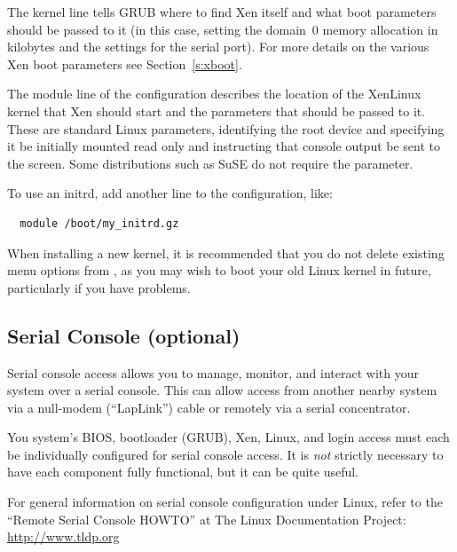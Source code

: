 \documentclass[11pt,twoside,final,openright]{report}
\begin{document}
The kernel line tells GRUB where to find Xen itself and what boot
parameters should be passed to it (in this case, setting the domain~0
memory allocation in kilobytes and the settings for the serial port).
For more details on the various Xen boot parameters see
Section~\ref{s:xboot}.

The module line of the configuration describes the location of the
XenLinux kernel that Xen should start and the parameters that should be
passed to it. These are standard Linux parameters, identifying the root
device and specifying it be initially mounted read only and instructing
that console output be sent to the screen. Some distributions such as
SuSE do not require the  parameter.


To use an initrd, add another  line to the configuration,
like: {\small
\begin{verbatim}
  module /boot/my_initrd.gz
\end{verbatim}
}


When installing a new kernel, it is recommended that you do not delete
existing menu options from , as you may wish to boot your
old Linux kernel in future, particularly if you have problems.

\subsection{Serial Console (optional)}

Serial console access allows you to manage, monitor, and interact with
your system over a serial console.  This can allow access from another
nearby system via a null-modem (``LapLink'') cable or remotely via a serial
concentrator.

You system's BIOS, bootloader (GRUB), Xen, Linux, and login access must
each be individually configured for serial console access.  It is
\emph{not} strictly necessary to have each component fully functional,
but it can be quite useful.

For general information on serial console configuration under Linux,
refer to the ``Remote Serial Console HOWTO'' at The Linux Documentation
Project: \url{http://www.tldp.org} 
\end{document}
